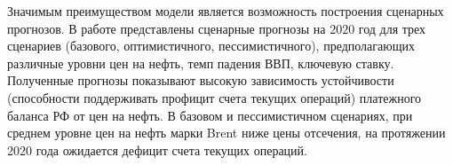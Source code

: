 \documentclass[a4paper, 14pt]{extarticle}
\begin{document}
Значимым преимуществом модели является возможность построения сценарных прогнозов.
В работе представлены сценарные прогнозы на $2020$ год для трех сценариев (базового, оптимистичного, пессимистичного), предполагающих различные уровни цен на нефть, темп падения ВВП, ключевую ставку.
Полученные прогнозы показывают высокую зависимость устойчивости (способности поддерживать профицит счета текущих операций) платежного баланса РФ от цен на нефть.
В базовом и пессимистичном сценариях, при среднем уровне цен на нефть марки Brent ниже цены отсечения, на протяжении $2020$ года ожидается дефицит счета текущих операций.


\newpage

\printbibliography
\end{document}
